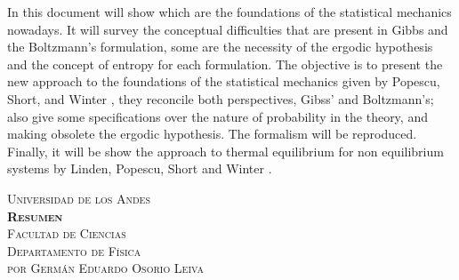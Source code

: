 \documentclass[11pt]{book}
\theoremstyle{definition}
\begin{document}
\vspace*{4em}
In this document will show which are the foundations of the statistical mechanics nowadays. It will survey the conceptual difficulties that are present in Gibbs and the Boltzmann's formulation, some are the necessity of the ergodic hypothesis and the concept of entropy for each formulation. The objective is to present the new approach to the foundations of the statistical mechanics given by Popescu, Short, and Winter \cite{Popescu2006}, they reconcile both perspectives, Gibss' and Boltzmann's; also give some specifications over the nature of probability in the theory, and making obsolete the ergodic hypothesis. The formalism will be reproduced. Finally, it will be show the approach to thermal equilibrium for non equilibrium  systems by Linden, Popescu, Short and Winter \cite{LindenPaper}.



\newpage

\begin{center}
\vspace*{5em}
\textsc{\normalsize Universidad de los Andes}\\[1em]

\textsc{\large \textbf{Resumen}}\\[1em]

\textsc{\normalsize Facultad de Ciencias}\\[1em]

\textsc{\normalsize Departamento de Física}\\[1em]

\textsc{\small por Germán Eduardo Osorio Leiva}
\end{center}
\end{document}
